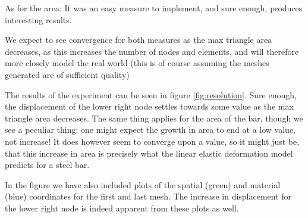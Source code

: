 \documentclass[sigconf]{acmart}
\begin{document}
As for the area: It was an easy measure to implement, and sure enough, produces interesting results.

We expect to see convergence for both measures as the max triangle area decreases, as this increases the number of nodes and elements, and will therefore more closely model the real world (this is of course assuming the meshes generated are of sufficient quality)

The results of the experiment can be seen in figure \ref{fig:resolution}. Sure enough, the displacement of the lower right node settles towards some value as the max triangle area decreases. The same thing applies for the area of the bar, though we see a peculiar thing: one might expect the growth in area to end at a low value, not increase! It does however seem to converge upon a value, so it might just be, that this increase in area is precisely what the linear elastic deformation model predicts for a steel bar.

In the figure we have also included plots of the spatial (green) and material (blue) coordinates for the first and last mesh. The increase in displacement for the lower right node is indeed apparent from these plots as well.
\end{document}
